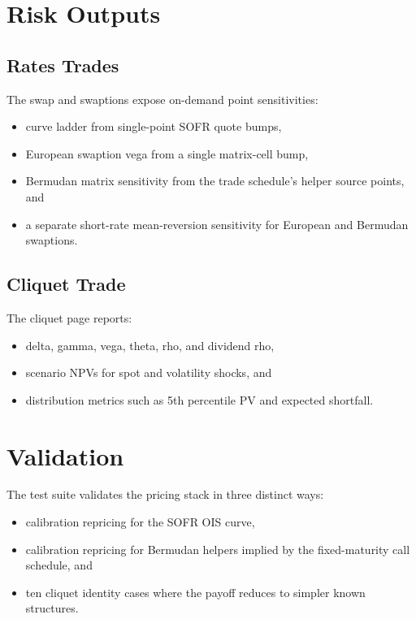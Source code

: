 \documentclass[conference]{IEEEtran}
\begin{document}
\section{Risk Outputs}
\subsection{Rates Trades}
The swap and swaptions expose on-demand point sensitivities:
\begin{itemize}[leftmargin=1.5em]
    \item curve ladder from single-point SOFR quote bumps,
    \item European swaption vega from a single matrix-cell bump,
    \item Bermudan matrix sensitivity from the trade schedule's helper source points, and
    \item a separate short-rate mean-reversion sensitivity for European and Bermudan swaptions.
\end{itemize}

\subsection{Cliquet Trade}
The cliquet page reports:
\begin{itemize}[leftmargin=1.5em]
    \item delta, gamma, vega, theta, rho, and dividend rho,
    \item scenario NPVs for spot and volatility shocks, and
    \item distribution metrics such as 5th percentile PV and expected shortfall.
\end{itemize}

\section{Validation}
The test suite validates the pricing stack in three distinct ways:
\begin{itemize}[leftmargin=1.5em]
    \item calibration repricing for the SOFR OIS curve,
    \item calibration repricing for Bermudan helpers implied by the fixed-maturity call schedule, and
    \item ten cliquet identity cases where the payoff reduces to simpler known structures.
\end{itemize}
\end{document}

